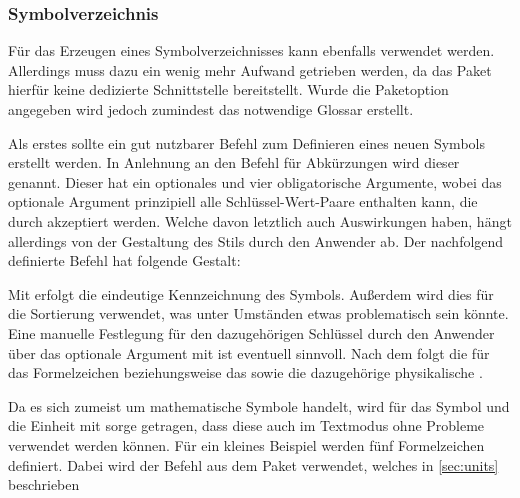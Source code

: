 \documentclass[%
  english,ngerman,%
  geometry=no,DIV=12,automark,%
]{tudscrartcl}
\begin{document}
\subsubsection{Symbolverzeichnis}
Für das Erzeugen eines Symbolverzeichnisses kann ebenfalls  
verwendet werden. Allerdings muss dazu ein wenig mehr Aufwand getrieben werden, 
da das Paket hierfür keine dedizierte Schnittstelle bereitstellt. Wurde die 
Paketoption  angegeben wird jedoch zumindest das notwendige 
Glossar erstellt.

Als erstes sollte ein gut nutzbarer Befehl zum Definieren eines neuen Symbols 
erstellt werden. In Anlehnung an den Befehl für Abkürzungen wird dieser 
 genannt. Dieser hat ein optionales und vier obligatorische 
Argumente, wobei das optionale Argument prinzipiell alle Schlüssel-Wert-Paare 
enthalten kann, die durch  akzeptiert werden. Welche davon 
letztlich auch Auswirkungen haben, hängt allerdings von der Gestaltung des 
Stils durch den Anwender ab. Der nachfolgend definierte Befehl hat folgende 
Gestalt:
%
\begin{quoting}[leftmargin=\parindent]
\LParameter{}%
\end{quoting}
%
Mit  erfolgt die eindeutige Kennzeichnung des Symbols. Außerdem 
wird dies für die Sortierung verwendet, was unter Umständen etwas problematisch 
sein könnte. Eine manuelle Festlegung für den dazugehörigen Schlüssel durch den 
Anwender über das optionale Argument mit  ist 
eventuell sinnvoll. Nach dem  folgt die  für 
das Formelzeichen beziehungsweise das  sowie die dazugehörige 
physikalische .
%
\CodeHook{\let\newcommand\renewcommand}
\begin{Preamble*}
\newcommand*{\newsymbol}[5][]{%
  \newglossaryentry{#2}{%
    type=symbols,%
    description={},%
    name={#3},%
    symbol={\ensuremath{#4}},%
    user1={\ensuremath{\mathrm{#5}}},%
    sort={#2},%
    #1%
  }%
}

\end{Preamble*}
%
Da es sich zumeist um mathematische Symbole handelt, wird für das Symbol und 
die Einheit mit  sorge getragen, dass diese auch im 
Textmodus ohne Probleme verwendet werden können. Für ein kleines Beispiel 
werden fünf Formelzeichen definiert. Dabei wird der Befehl  aus 
dem Paket  verwendet, welches in \autoref{sec:units} beschrieben 
\end{document}
